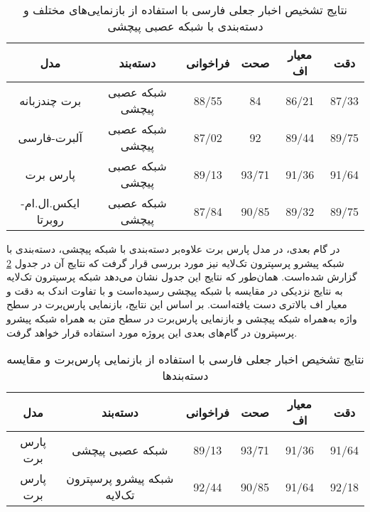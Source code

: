 \begin{table}
	\caption{نتایج تشخیص اخبار جعلی فارسی با استفاده از بازنمایی‌های مختلف و دسته‌بندی با شبکه عصبی پیچشی}
	\label{table.text_result_cnn}
	\begin{center}
		\begin{tabular}{|c|c|c|c|c|c|}
			\hline
مدل & دسته‌بند  & فراخوانی & صحت & معیار اف & دقت \\
			\hline
برت چندزبانه & شبکه عصبی پیچشی  & 88/55 & 84 & 86/21 & 87/33 \\
			\hline
آلبرت-فارسی & شبکه عصبی پیچشی  & 87/02 & 92 & 89/44 & 89/75 \\
			\hline
پارس برت & شبکه عصبی پیچشی & 89/13 & 93/71 & 91/36 & 91/64 \\
			\hline
ایکس.ال.ام-روبرتا & شبکه عصبی پیچشی & 87/84 & 90/85 & 89/32 & 89/75 \\
			\hline
		\end{tabular}
	\end{center}
\end{table}

در گام بعدی، در مدل پارس برت علاوه‌بر دسته‌بندی با شبکه پیچشی، دسته‌بندی با شبکه پیشرو پرسپترون تک‌لایه نیز مورد بررسی قرار گرفت که نتایج آن در جدول \ref{table.text_result_slp} گزارش شده‌است. همان‌طور که نتایج این جدول نشان می‌دهد شبکه پرسپترون تک‌لایه به نتایج نزدیکی در مقایسه با شبکه پیچشی رسیده‌است و با تفاوت اندک به دقت و معیار اف بالاتری دست یافته‌است. بر اساس این نتایج، بازنمایی پارس‌برت در سطح واژه به‌همراه شبکه پیچشی و بازنمایی پارس‌برت در سطح متن به همراه شبکه پیشرو پرسپترون در گام‌های بعدی این پروژه مورد استفاده قرار خواهد گرفت.

\begin{table}
	\caption{نتایج تشخیص اخبار جعلی فارسی با استفاده از بازنمایی پارس‌برت و مقایسه دسته‌بندها}
	\label{table.text_result_slp}
	\begin{center}
		\begin{tabular}{|c|c|c|c|c|c|}
			\hline
مدل & دسته‌بند & فراخوانی & صحت & معیار اف & دقت \\
			\hline
پارس برت & شبکه عصبی پیچشی  & 89/13 & 93/71 & 91/36 & 91/64 \\
			\hline
پارس برت & شبکه پیشرو پرسپترون تک‌لایه & 92/44 & 90/85 & 91/64 & 92/18 \\
			\hline
		\end{tabular}
	\end{center}
\end{table}

